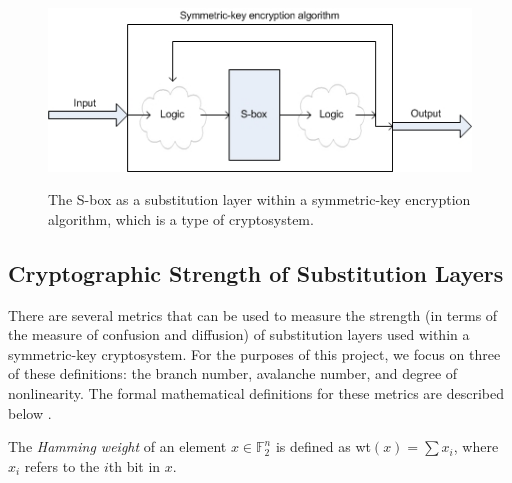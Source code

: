 \documentclass[11pt]{article}
\newcommand{\field}[1]{\mathbb{#1}} %
\begin{document}
\begin{figure}[!ht]
\centering
	\includegraphics[scale=0.75]{images/sub_layer.jpg} 
	\label{sublayer}
	\caption{The S-box as a substitution layer within a symmetric-key encryption algorithm, which is a type of cryptosystem.}
\end{figure}

\subsection{Cryptographic Strength of Substitution Layers}
\label{strength}

There are several metrics that can be used to measure the strength (in terms of the measure of confusion and diffusion) of substitution layers used within a symmetric-key cryptosystem. For the purposes of this project, we focus on three of these definitions: the branch number, avalanche number, and degree of nonlinearity. The formal mathematical definitions for these metrics are described below \cite{Mar_newanalysis}.

\begin{define}
The \emph{Hamming weight} of an element $x \in \field{F}_2^n$ is defined as wt$(x) = \sum x_i$, where $x_i$ refers to the $i$th bit in $x$.
\end{define}
\end{document}
